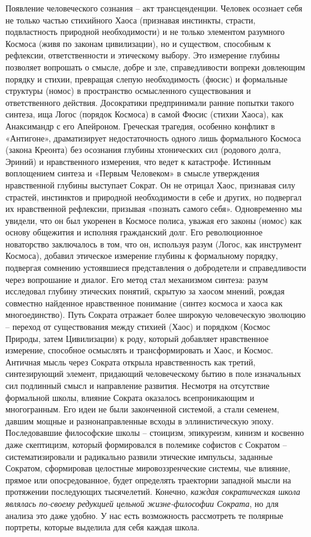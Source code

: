     Появление человеческого сознания – акт трансценденции. Человек осознает себя не только частью стихийного Хаоса (признавая инстинкты, страсти, подвластность природной необходимости) и не только элементом разумного Космоса (живя по законам цивилизации), но и существом, способным к рефлексии, ответственности и этическому выбору. Это измерение глубины позволяет вопрошать о смысле, добре и зле, справедливости вопреки довлеющим порядку и стихии, превращая слепую необходимость (фюсис) и формальные структуры (номос) в пространство осмысленного существования и ответственного действия.
    Досократики предпринимали ранние попытки такого синтеза, ища Логос (порядок Космоса) в самой Фюсис (стихии Хаоса), как Анаксимандр с его Апейроном. Греческая трагедия, особенно конфликт в «Антигоне», драматизирует недостаточность одного лишь формального Космоса (закона Креонта) без осознания глубины хтонических сил (родового долга, Эриний) и нравственного измерения, что ведет к катастрофе.
    Истинным воплощением синтеза и «Первым Человеком» в смысле утверждения нравственной глубины выступает Сократ. Он не отрицал Хаос, признавая силу страстей, инстинктов и природной необходимости в себе и других, но подвергал их нравственной рефлексии, призывая «познать самого себя». Одновременно мы увидели, что он был укоренен в Космосе полиса, уважая его законы (номос) как основу общежития и исполняя гражданский долг. Его революционное новаторство заключалось в том, что он, используя разум (Логос, как инструмент Космоса), добавил этическое измерение глубины к формальному порядку, подвергая сомнению устоявшиеся представления о добродетели и справедливости через вопрошание и диалог. Его метод стал механизмом синтеза: разум исследовал глубину этических понятий, скрытую за хаосом мнений, рождая совместно найденное нравственное понимание (синтез космоса и хаоса как многоединство).
    Путь Сократа отражает более широкую человеческую эволюцию – переход от существования между стихией (Хаос) и порядком (Космос Природы, затем Цивилизации) к роду, который добавляет нравственное измерение, способное осмыслять и трансформировать и Хаос, и Космос. Античная мысль через Сократа открыла нравственность как третий, синтезирующий элемент, придающий человеческому бытию в поле изначальных сил подлинный смысл и направление развития.
    Несмотря на отсутствие формальной школы, влияние Сократа оказалось всепроникающим и многогранным. Его идеи не были законченной системой, а стали семенем, давшим мощные и разнонаправленные всходы в эллинистическую эпоху. Последовавшие философские школы – стоицизм, эпикуреизм, кинизм и косвенно даже скептицизм, который формировался в полемике софистов с Сократом – систематизировали и радикально развили этические импульсы, заданные Сократом, сформировав целостные мировоззренческие системы, чье влияние, прямое или опосредованное, будет определять траектории западной мысли на протяжении последующих тысячелетий. Конечно, \textit{каждая сократическая школа являлась по-своему редукцией цельной жизне-философии Сократа}, но для анализа это даже удобно. У нас есть возможность рассмотреть те полярные портреты, которые выделила для себя каждая школа.
